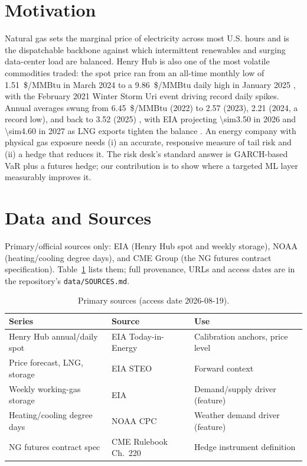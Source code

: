 \documentclass[11pt]{article}
\begin{document}
\section{Motivation}
Natural gas sets the marginal price of electricity across most U.S. hours and is the
dispatchable backbone against which intermittent renewables and surging
data-center load are balanced. Henry Hub is also one of the most volatile
commodities traded: the spot price ran from an all-time monthly low of
\SI{1.51}{\$/MMBtu} in March 2024 \citep{eia_hh_2024low} to a \SI{9.86}{\$/MMBtu}
daily high in January 2025 \citep{eia_hh_2025}, with the February 2021 Winter Storm
Uri event driving record daily spikes. Annual averages swung from
\SI{6.45}{\$/MMBtu} (2022) to \SI{2.57}{} (2023), \SI{2.21}{} (2024, a record low),
and back to \SI{3.52}{} (2025) \citep{eia_hh_2023,eia_hh_2024low,eia_hh_2025}, with
EIA projecting \SI{\sim3.50}{} in 2026 and \SI{\sim4.60}{} in 2027 as LNG exports
tighten the balance \citep{eia_steo_2026}. An energy company with physical gas
exposure needs (i) an accurate, responsive measure of tail risk and (ii) a hedge
that reduces it. The risk desk's standard answer is GARCH-based VaR plus a futures
hedge; our contribution is to show where a targeted ML layer measurably improves it.

\section{Data and Sources}\label{sec:data}
Primary/official sources only: EIA (Henry Hub spot and weekly storage), NOAA
(heating/cooling degree days), and CME Group (the NG futures contract
specification). Table~\ref{tab:p2src} lists them; full provenance, URLs and access
dates are in the repository's \texttt{data/SOURCES.md}.

\begin{table}[h]\centering\small
\caption{Primary sources (access date 2026-08-19).}\label{tab:p2src}
\begin{tabular}{@{}p{4.6cm}p{4.2cm}p{5.2cm}@{}}\toprule
\textbf{Series} & \textbf{Source} & \textbf{Use}\\\midrule
Henry Hub annual/daily spot & EIA Today-in-Energy \citep{eia_hh_2025,eia_hh_2024low,eia_hh_2023} & Calibration anchors, price level\\
Price forecast, LNG, storage & EIA STEO \citep{eia_steo_2026} & Forward context\\
Weekly working-gas storage & EIA \citep{eia_ng_storage} & Demand/supply driver (feature)\\
Heating/cooling degree days & NOAA CPC \citep{noaa_degree_days} & Weather demand driver (feature)\\
NG futures contract spec & CME Rulebook Ch.~220 \citep{cme_ng_specs} & Hedge instrument definition\\
\bottomrule\end{tabular}\end{table}
\end{document}
